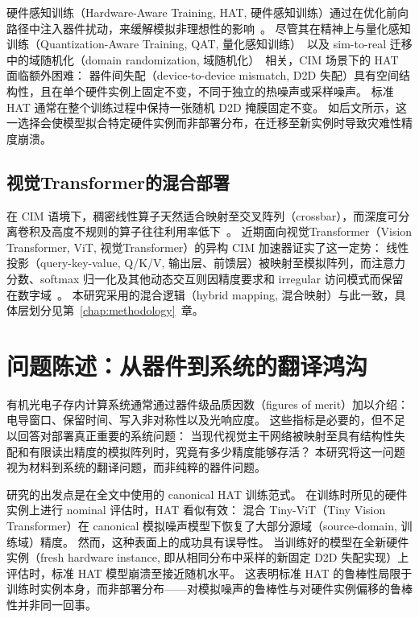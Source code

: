 硬件感知训练（Hardware-Aware Training, HAT, 硬件感知训练）通过在优化前向路径中注入器件扰动，来缓解模拟非理想性的影响~\parencite{joshi2020accurate}。
尽管其在精神上与量化感知训练（Quantization-Aware Training, QAT, 量化感知训练）~\parencite{choi2019pact}以及 sim-to-real 迁移中的域随机化（domain randomization, 域随机化）~\parencite{tobin2017domain}相关，CIM 场景下的 HAT 面临额外困难：
器件间失配（device-to-device mismatch, D2D 失配）具有空间结构性，且在单个硬件实例上固定不变，不同于独立的热噪声或采样噪声。
标准 HAT 通常在整个训练过程中保持一张随机 D2D 掩膜固定不变。
如后文所示，这一选择会使模型拟合特定硬件实例而非部署分布，在迁移至新实例时导致灾难性精度崩溃。

\subsection{视觉Transformer的混合部署}

在 CIM 语境下，稠密线性算子天然适合映射至交叉阵列（crossbar），而深度可分离卷积及高度不规则的算子往往利用率低下~\parencite{wu2023bwq,wang2024epim,ge2024allspark}。
近期面向视觉Transformer（Vision Transformer, ViT, 视觉Transformer）的异构 CIM 加速器证实了这一定势：
线性投影（query-key-value, Q/K/V, 输出层、前馈层）被映射至模拟阵列，而注意力分数、softmax 归一化及其他动态交互则因精度要求和 irregular 访问模式而保留在数字域~\parencite{kim2025hemlet,lin2024hardsea}。
本研究采用的混合逻辑（hybrid mapping, 混合映射）与此一致，具体层划分见第~\ref{chap:methodology}~章。

\section{问题陈述：从器件到系统的翻译鸿沟}

有机光电子存内计算系统通常通过器件级品质因数（figures of merit）加以介绍：电导窗口、保留时间、写入非对称性以及光响应度。
这些指标是必要的，但不足以回答对部署真正重要的系统问题：
当现代视觉主干网络被映射至具有结构性失配和有限读出精度的模拟阵列时，究竟有多少精度能够存活？
本研究将这一问题视为材料到系统的翻译问题，而非纯粹的器件问题。

研究的出发点是在全文中使用的 canonical HAT 训练范式。
在训练时所见的硬件实例上进行 nominal 评估时，HAT 看似有效：
混合 Tiny-ViT（Tiny Vision Transformer）在 canonical 模拟噪声模型下恢复了大部分源域（source-domain, 训练域）精度。
然而，这种表面上的成功具有误导性。
当训练好的模型在全新硬件实例（fresh hardware instance, 即从相同分布中采样的新固定 D2D 失配实现）上评估时，标准 HAT 模型崩溃至接近随机水平。
这表明标准 HAT 的鲁棒性局限于训练时实例本身，而非部署分布——对模拟噪声的鲁棒性与对硬件实例偏移的鲁棒性并非同一回事。

